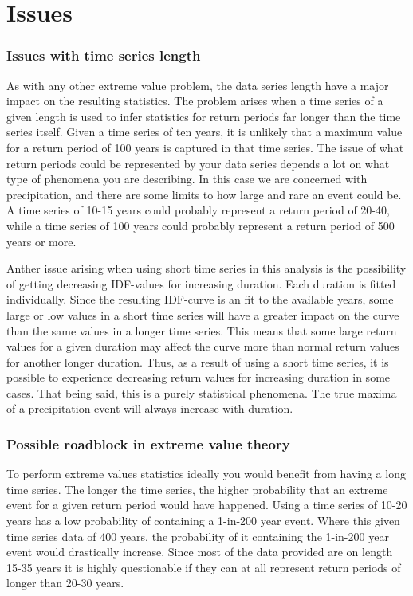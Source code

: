 \section{Issues}
\label{sec:issues}

\subsubsection{Issues with time series length}

As with any other extreme value problem, the data series length have a major impact on the resulting statistics. The problem arises when a time series of a given length is used to infer statistics for return periods far longer than the time series itself. Given a time series of ten years, it is unlikely that a maximum value for a return period of 100 years is captured in that time series. The issue of what return periods could be represented by your data series depends a lot on what type of phenomena you are describing. In this case we are concerned with precipitation, and there are some limits to how large and rare an event could be. A time series of 10-15 years could probably represent a return period of 20-40, while a time series of 100 years could probably represent a return period of 500 years or more. 

Anther issue arising when using short time series in this analysis is the possibility of getting decreasing IDF-values for increasing duration. Each duration is fitted individually. Since the resulting IDF-curve is an fit to the available years, some large or low values in a short time series will have a greater impact on the curve than the same values in a longer time series. This means that some large return values for a given duration may affect the curve more than normal return values for another longer duration. Thus, as a result of using a short time series, it is possible to experience decreasing return values for increasing duration in some cases. That being said, this is a purely statistical phenomena. The true maxima of a precipitation event will always increase with duration.    


\subsubsection{Possible roadblock in extreme value theory}
To perform extreme values statistics ideally you would benefit from having a long time series. The longer the time series, the higher probability that an extreme event for a given return period would have happened. Using a time series of 10-20 years has a low probability of containing a 1-in-200 year event. Where this given time series data of 400 years, the probability of it containing the 1-in-200 year event would drastically increase. Since most of the data provided are on length 15-35 years it is highly questionable if they can at all represent return periods of longer than 20-30 years. 



